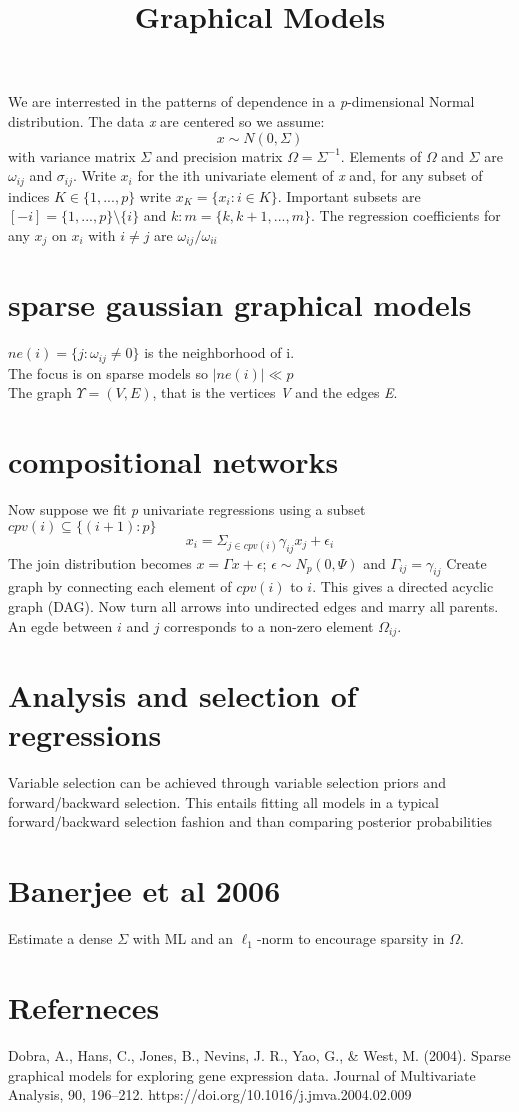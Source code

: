 \documentclass{article}
\title{Graphical Models}
\begin{document}
	\maketitle
	We are interrested in the patterns of dependence in a \textit{p}-dimensional Normal distribution. The data \textit{x} are centered so we assume:
	$$x\sim N(0, \Sigma)$$
	with variance matrix $\Sigma$ and precision matrix $\Omega = \Sigma^{-1}$. Elements of $\Omega$ and $\Sigma$ are $\omega_{ij}$ and $\sigma_{ij}$.
	Write $x_i$ for the ith univariate element of \textit{x} and, for any subset of indices $K \in \{1, ..., p\}$ write $x_K = \{x_i:i \in K\}$. Important subsets are $[-i] = \{1, ..., p\} \setminus \{i\}$ and $k:m = \{k, k+1, ..., m\}$. The regression coefficients for any $x_j$ on $x_i$ with $i \neq j$ are $\omega_{ij} / \omega_{ii}$
	
	\section{sparse gaussian graphical models}
	$ne(i) = \{j:\omega_{ij} \neq 0\}$ is the neighborhood of i. \\
	The focus is on sparse models so $|ne(i)| \ll p$ \\
	The graph $\Upsilon = (V,E)$, that is the vertices \textit{V} and the edges \textit{E}. 
	\section{compositional networks}
	Now suppose we fit \textit{p} univariate regressions using a subset $cpv(i) \subseteq \{(i+1):p\}$ \\
	$$x_i = \Sigma_{j \in cpv(i)} \gamma_{ij} x_j + \epsilon_i$$ 
	The join distribution becomes 
	$ x = \Gamma x + \epsilon$; $\epsilon \sim N_p(0, \Psi)$ and $\Gamma_{ij} = \gamma_{ij}$
	Create graph by connecting each element of $cpv(i)$ to $i$. This gives a directed acyclic graph (DAG). Now turn all arrows into undirected edges and marry all parents. An egde between $i$ and $j$ corresponds to a non-zero element $\Omega_{ij}$. 
	\section{Analysis and selection of regressions}
	Variable selection can be achieved through variable selection priors and forward/backward selection. This entails fitting all models in a typical forward/backward selection fashion and than comparing posterior probabilities 
	
	\section{Banerjee et al 2006}
	Estimate a dense $\Sigma$ with ML and an $\ell_1$-norm to encourage sparsity in $\Omega$. 
	
	\section{Referneces}
	Dobra, A., Hans, C., Jones, B., Nevins, J. R., Yao, G., \& West, M. (2004). Sparse graphical models for exploring gene expression data. Journal of Multivariate Analysis, 90, 196–212. https://doi.org/10.1016/j.jmva.2004.02.009
	
\end{document}

